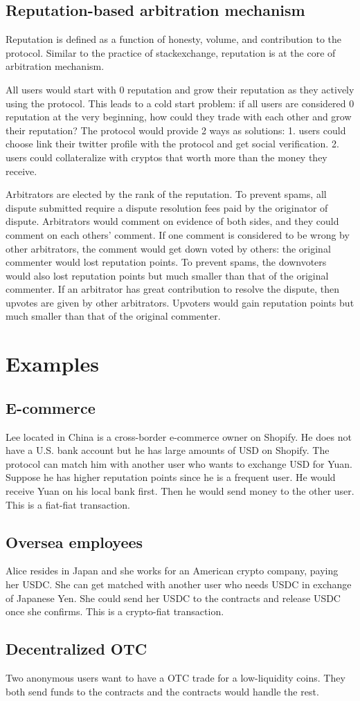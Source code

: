 \documentclass[letterpaper,twocolumn,10pt]{article}
\begin{document}
\subsection{Reputation-based arbitration mechanism}
Reputation is defined as a function of honesty, volume, and contribution to the protocol. Similar to the practice of stackexchange, reputation is at the core of arbitration mechanism. 

All users would start with 0 reputation and grow their reputation as they actively using the protocol. This leads to a cold start problem: if all users are considered 0 reputation at the very beginning, how could they trade with each other and grow their reputation? The protocol would provide 2 ways as solutions: 1. users could choose link their twitter profile with the protocol and get social verification. 2. users could collateralize with cryptos that worth more than the money they receive.

 Arbitrators are elected by the rank of the reputation. To prevent spams, all dispute submitted require a dispute resolution fees paid by the originator of dispute. Arbitrators would comment on evidence of both sides, and they could comment on each others' comment. If one comment is considered to be wrong by other arbitrators, the comment would get down voted by others: the original commenter would lost reputation points. To prevent spams, the downvoters would also lost reputation points but much smaller than that of the original commenter. If an arbitrator has great contribution to resolve the dispute, then upvotes are given by other arbitrators. Upvoters would gain reputation points but much smaller than that of the original commenter.
 
 \section{Examples}
 \subsection{E-commerce}
 Lee located in China is a cross-border e-commerce owner on Shopify. He does not have a U.S. bank account but he has large amounts of USD on Shopify. The protocol can match him with another user who wants to exchange USD for Yuan. Suppose he has higher reputation points since he is a frequent user. He would receive Yuan on his local bank first. Then he would send money to the other user. This is a fiat-fiat transaction.
 
 \subsection{Oversea employees}
Alice resides in Japan and she works for an American crypto company, paying her USDC. She can get matched with another user who needs USDC in exchange of Japanese Yen. She could send her USDC to the contracts and release USDC once she confirms. This is a crypto-fiat transaction.

 \subsection{Decentralized OTC}
Two anonymous users want to have a OTC trade for a low-liquidity coins. They both send funds to the contracts and the contracts would handle the rest. 

{\footnotesize 
}


\end{document}
